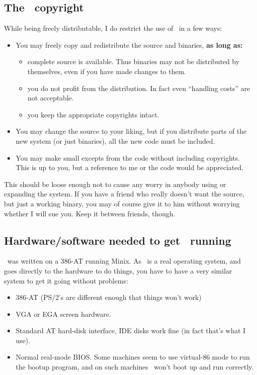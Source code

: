 \subsection{The \Linux\ copyright}

While being freely distributable, I do restrict the use of \Linux\ in a
few ways:
%
\begin{itemize}
\item You may freely copy and redistribute the source and binaries, {\bf
as long as:}
\begin{itemize}
\item complete source is available. Thus binaries may not be distributed
by themselves, even if you have made changes to them.
\item you do not profit from the distribution. In fact even ``handling
costs'' are not acceptable.
\item you keep the appropriate copyrights intact.
\end{itemize}
\item You may change the source to your liking, but if you distribute
parts of the new system (or just binaries), all the new code must be
included.
\item You may make small excepts from the code without including
copyrights. This is up to you, but a reference to me or the code would
be appreciated.
\end{itemize}
This should be loose enough not to cause any worry in anybody using or
expanding the system. If you have a friend who really doesn't want the
source, but just a working binary, you may of course give it to him
without worrying whether I will sue you. Keep it between friends, though.

\subsection{Hardware/software needed to get \Linux\ running}

\Linux\ was written on a 386-AT running Minix. As \Linux\ is a real
operating system, and goes directly to the hardware to do things, you
have to have a very similar system to get it going without problems:
\begin{itemize}
\item 386-AT (PS/2's are different enough that things won't work)
\item VGA or EGA screen hardware.
\item Standard AT hard-disk interface, IDE disks work fine (in fact
that's what I use).
\item Normal real-mode BIOS. Some machines seem to use virtual-86 mode
to run the bootup program, and on such machines \Linux\ won't boot up
and run correctly.
\end{itemize}

